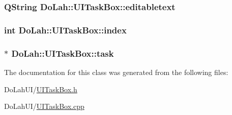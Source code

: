 \subsubsection[{editabletext}]{\setlength{\rightskip}{0pt plus 5cm}Q\+String Do\+Lah\+::\+U\+I\+Task\+Box\+::editabletext\hspace{0.3cm}{\ttfamily [private]}}\label{class_do_lah_1_1_u_i_task_box_a44c6395f81e68b4424c2b91a8b24af7d}
\hypertarget{class_do_lah_1_1_u_i_task_box_a8f8946ade721e68fd3dbdcf5fa056a5d}{}
\subsubsection[{index}]{\setlength{\rightskip}{0pt plus 5cm}int Do\+Lah\+::\+U\+I\+Task\+Box\+::index\hspace{0.3cm}{\ttfamily [private]}}\label{class_do_lah_1_1_u_i_task_box_a8f8946ade721e68fd3dbdcf5fa056a5d}
\hypertarget{class_do_lah_1_1_u_i_task_box_a5c2170230a8892b1ad5959165b97f2ee}{}
\subsubsection[{task}]{$\ast$ Do\+Lah\+::\+U\+I\+Task\+Box\+::task\hspace{0.3cm}{\ttfamily [private]}}\label{class_do_lah_1_1_u_i_task_box_a5c2170230a8892b1ad5959165b97f2ee}


The documentation for this class was generated from the following files\+:\begin{DoxyCompactItemize}
\item 
Do\+Lah\+U\+I/\hyperlink{_u_i_task_box_8h}{U\+I\+Task\+Box.\+h}\item 
Do\+Lah\+U\+I/\hyperlink{_u_i_task_box_8cpp}{U\+I\+Task\+Box.\+cpp}\end{DoxyCompactItemize}
